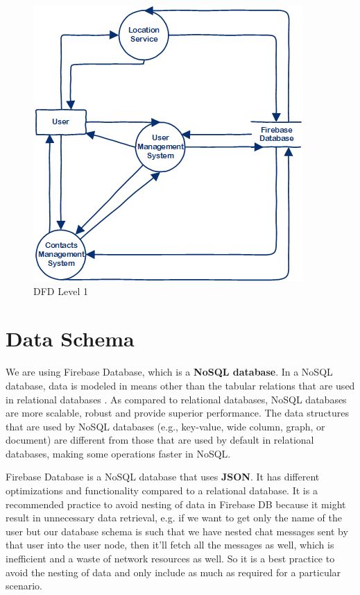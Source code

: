 \begin{figure}
    \centering
        \includegraphics{images/dfd1.png}
    \caption{DFD Level 1}
    \label{fig:dfd1}
\end{figure}


\section{Data Schema} \label{data schema}
We are using Firebase Database, which is a \textbf{NoSQL database}. In a NoSQL database, data is modeled in means other than the tabular relations that are used in relational databases \cite{NoSQLWiki2018}. As compared to relational databases, NoSQL databases are more scalable, robust and provide superior performance. The data structures that are used by NoSQL databases (e.g., key-value, wide column, graph, or document) are different from those that are used by default in relational databases, making some operations faster in NoSQL.

Firebase Database is a NoSQL database that uses \textbf{JSON}. It has different optimizations and functionality compared to a relational database. It is a recommended practice to avoid nesting of data in Firebase DB because it might result in unnecessary data retrieval, e.g. if we want to get only the name of the user but our database schema is such that we have nested chat messages sent by that user into the user node, then it'll fetch all the messages as well, which is inefficient and a waste of network resources as well. So it is a best practice to avoid the nesting of data and only include as much as required for a particular scenario.

